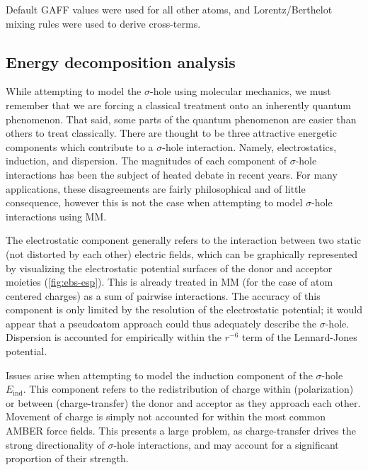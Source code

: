 \begin{refsection}
Default GAFF values were used for all other atoms, and Lorentz/Berthelot mixing rules were used to derive cross-terms.

\subsection{Energy decomposition analysis}
While attempting to model the $\sigma$-hole using molecular mechanics, we must remember that we are forcing a classical treatment onto an inherently quantum phenomenon.
That said, some parts of the quantum phenomenon are easier than others to treat classically.
There are thought to be three attractive energetic components which contribute to a $\sigma$-hole interaction.
Namely, electrostatics, induction, and dispersion.\autocite{Bleiholder2006,Bleiholder2007,Pascoe2017}
The magnitudes of each component of $\sigma$-hole interactions has been the subject of heated debate in recent years.
For many applications, these disagreements are fairly philosophical and of little consequence, however this is not the case when attempting to model $\sigma$-hole interactions using MM.

The electrostatic component generally refers to the interaction between two static (not distorted by each other) electric fields, which can be graphically represented by visualizing the electrostatic potential surfaces of the donor and acceptor moieties (\cref{fig:ebs-esp}).
This is already treated in MM (for the case of atom centered charges) as a sum of pairwise interactions.
The accuracy of this component is only limited by the resolution of the electrostatic potential; it would appear that a pseudoatom approach could thus adequately describe the $\sigma$-hole.
Dispersion is accounted for empirically within the $r^{-6}$ term of the Lennard-Jones potential.

Issues arise when attempting to model the induction component of the $\sigma$-hole $E_{\mathrm{ind}}$.
This component refers to the redistribution of charge within (polarization) or between (charge-transfer) the donor and acceptor as they approach each other.
Movement of charge is simply not accounted for within the most common AMBER force fields.
This presents a large problem, as charge-transfer drives the strong directionality of $\sigma$-hole interactions, and may account for a significant proportion of their strength.


\end{refsection}

